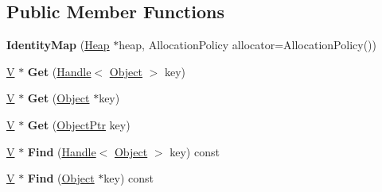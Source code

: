 \subsection*{Public Member Functions}
\begin{DoxyCompactItemize}
\item 
\mbox{\label{classv8_1_1internal_1_1IdentityMap_abaeb21fcacb21c23d053618497cb0f1a}} 
{\bfseries Identity\+Map} (\mbox{\hyperlink{classv8_1_1internal_1_1Heap}{Heap}} $\ast$heap, Allocation\+Policy allocator=Allocation\+Policy())
\item 
\mbox{\label{classv8_1_1internal_1_1IdentityMap_aca87d8bcb92d9bfe467610483185ae2c}} 
\mbox{\hyperlink{classV}{V}} $\ast$ {\bfseries Get} (\mbox{\hyperlink{classv8_1_1internal_1_1Handle}{Handle}}$<$ \mbox{\hyperlink{classv8_1_1internal_1_1Object}{Object}} $>$ key)
\item 
\mbox{\label{classv8_1_1internal_1_1IdentityMap_a035a91ccce45667b49901f14b539b1b2}} 
\mbox{\hyperlink{classV}{V}} $\ast$ {\bfseries Get} (\mbox{\hyperlink{classv8_1_1internal_1_1Object}{Object}} $\ast$key)
\item 
\mbox{\label{classv8_1_1internal_1_1IdentityMap_adf74e55732e87eddefac303351926bbb}} 
\mbox{\hyperlink{classV}{V}} $\ast$ {\bfseries Get} (\mbox{\hyperlink{classv8_1_1internal_1_1ObjectPtr}{Object\+Ptr}} key)
\item 
\mbox{\label{classv8_1_1internal_1_1IdentityMap_ae5b7b29092807fd6fd667001ca54f935}} 
\mbox{\hyperlink{classV}{V}} $\ast$ {\bfseries Find} (\mbox{\hyperlink{classv8_1_1internal_1_1Handle}{Handle}}$<$ \mbox{\hyperlink{classv8_1_1internal_1_1Object}{Object}} $>$ key) const
\item 
\mbox{\label{classv8_1_1internal_1_1IdentityMap_a44fb4a573e93a228d1bdfeedde0e03ad}} 
\mbox{\hyperlink{classV}{V}} $\ast$ {\bfseries Find} (\mbox{\hyperlink{classv8_1_1internal_1_1Object}{Object}} $\ast$key) const
\item 
\mbox{\label{classv8_1_1internal_1_1IdentityMap_abcdeee9ca9fb689f7fcfe41552837bd9}} 

\end{DoxyCompactItemize}
